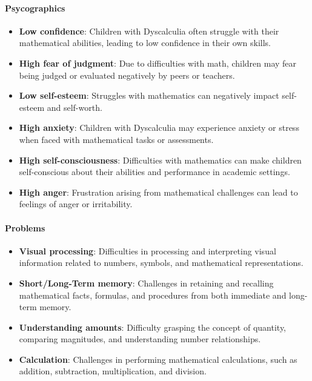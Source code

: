 \paragraph{Psycographics}
\begin{itemize}
    \item \textbf{Low confidence}: Children with Dyscalculia often struggle with their mathematical abilities, leading to low confidence in their own skills.
    \item \textbf{High fear of judgment}: Due to difficulties with math, children may fear being judged or evaluated negatively by peers or teachers.
    \item \textbf{Low self-esteem}: Struggles with mathematics can negatively impact self-esteem and self-worth.
    \item \textbf{High anxiety}: Children with Dyscalculia may experience anxiety or stress when faced with mathematical tasks or assessments.
    \item \textbf{High self-consciousness}: Difficulties with mathematics can make children self-conscious about their abilities and performance in academic settings.
    \item \textbf{High anger}: Frustration arising from mathematical challenges can lead to feelings of anger or irritability.
\end{itemize}

\paragraph{Problems}
\begin{itemize}
    \item \textbf{Visual processing}: Difficulties in processing and interpreting visual information related to numbers, symbols, and mathematical representations.
    \item \textbf{Short/Long-Term memory}: Challenges in retaining and recalling mathematical facts, formulas, and procedures from both immediate and long-term memory.
    \item \textbf{Understanding amounts}: Difficulty grasping the concept of quantity, comparing magnitudes, and understanding number relationships.
    \item \textbf{Calculation}: Challenges in performing mathematical calculations, such as addition, subtraction, multiplication, and division.
\end{itemize}

